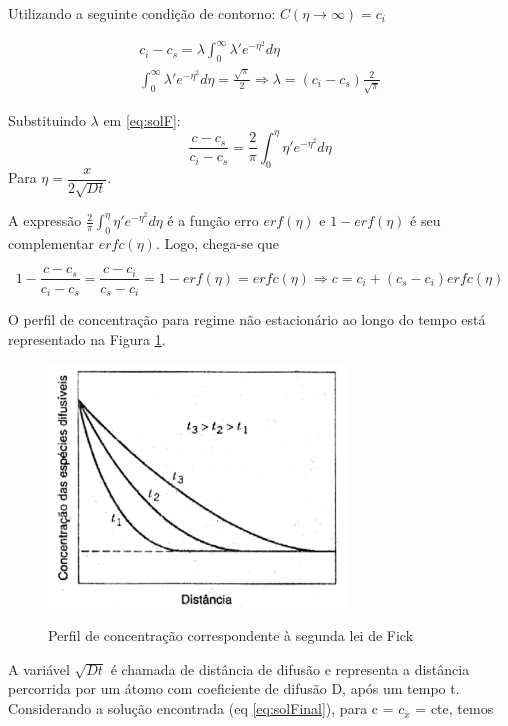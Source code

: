 \documentclass[]{politex}
\begin{document}
Utilizando a seguinte condição de contorno: $C(\eta\rightarrow \infty) = c_i$ 

\begin{gather*}	
	c_i - c_s = \lambda\int_{0}^{\infty} \lambda'e^{-\eta^2} d\eta  \\
	\int_{0}^{\infty} \lambda'e^{-\eta^2} d\eta  = \frac{\sqrt{\pi}}{2} \Rightarrow 			\lambda = (c_i - c_s)\frac{2}{\sqrt{\pi}}
\end{gather*}

Substituindo $\lambda$ em \autoref{eq:solF}:
\begin{equation} \label{eq:solG}
	\frac{c - c_s}{c_i - c_s} = \frac{2}{\pi} \int_{0}^{\eta} \eta'e^{-\eta^2} d\eta   
\end{equation}
Para $\eta = \dfrac{x}{2\sqrt{Dt}}$.

A expressão $ \frac{2}{\pi} \int_{0}^{\eta} \eta'e^{-\eta^2} d\eta $ é a função erro $erf(\eta)$ e  $1 - erf(\eta)$ é seu complementar $erfc(\eta)$. Logo, chega-se que 

\begin{equation} \label{eq:solFinal}
	1 - \frac{c - c_s}{c_i - c_s} = \frac{c - c_i}{c_s - c_i} = 1 - erf(\eta) = erfc(\eta) \Rightarrow c = c_i + (c_s - c_i) erfc(\eta)
\end{equation}

\par O perfil de concentração para regime não estacionário ao longo do tempo está representado na Figura \ref{fig:segundaLei}.

\begin{figure}[ht]
	\caption{Perfil de concentração correspondente à segunda lei de Fick}
	\includegraphics[width=80mm,scale=0.5]{segundaLei}
	\label{fig:segundaLei}
	\centering
\end{figure}

\par
	A variável $\sqrt{Dt}$ é chamada de distância de difusão e representa a distância percorrida por um átomo com coeficiente de difusão D, após um tempo t. Considerando a solução encontrada (eq \autoref{eq:solFinal}), para c =  $c_x$ = cte, temos 
\end{document}
